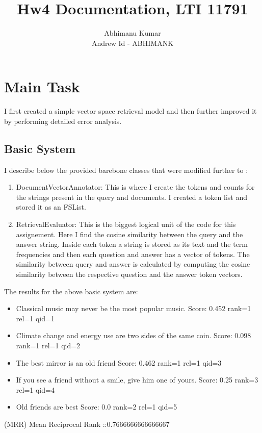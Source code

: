 \documentclass{article}
\title{Hw4 Documentation, LTI 11791}
\author{Abhimanu Kumar \\ Andrew Id - ABHIMANK}
\begin{document}
\maketitle

\section{Main Task }
I first created a simple vector space retrieval model and then further improved it by 
performing detailed error analysis.

\subsection{Basic System}
I describe below the provided barebone classes that were modified further to :
\begin{enumerate}
\item  DocumentVectorAnnotator: This is where I create the tokens and counts for the 
strings present in the query and documents. 
I created a token list and stored it as an FSList.

\item RetrievalEvaluator: This is the biggest logical unit of the code for this 
assignement. Here I find the cosine similarity between the query and the answer 
string. Inside each token a string is stored as its text and the term frequencies and 
then each question and answer has a vector of tokens.  The similarity between  
query and answer is calculated by computing the cosine similarity between the 
respective question and the answer token vectors.


\end{enumerate}

The results for the above basic system are:
\begin{itemize}
\item Classical music may never be the most popular music. Score: 0.452 rank=1 rel=1 qid=1
\item Climate change and energy use are two sides of the same coin. Score: 0.098 rank=1 rel=1 qid=2
\item The best mirror is an old friend Score: 0.462 rank=1 rel=1 qid=3
\item If you see a friend without a smile, give him one of yours. Score: 0.25 rank=3 rel=1 qid=4

\item Old friends are best  Score: 0.0 rank=2 rel=1 qid=5 

\end{itemize}
(MRR) Mean Reciprocal Rank ::0.7666666666666667
\end{document}
